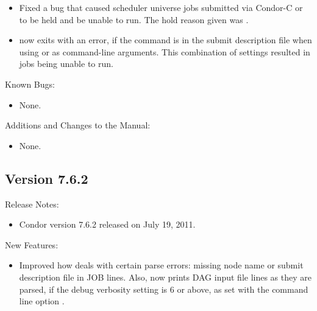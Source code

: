 \begin{itemize}
\item Fixed a bug that caused scheduler universe jobs submitted via
Condor-C or   to be held and be unable to run.
The hold reason given was .

\item {} now exits with an error,
if the command  is in the submit description file
when using  or  as command-line arguments. 
This combination of settings resulted in jobs being unable to run.

\end{itemize}

\noindent Known Bugs:

\begin{itemize}

\item None.

\end{itemize}

\noindent Additions and Changes to the Manual:

\begin{itemize}

\item None.

\end{itemize}


\subsection*{\label{sec:New-7-6-2}Version 7.6.2}

\noindent Release Notes:

\begin{itemize}

\item Condor version 7.6.2 released on July 19, 2011.

\end{itemize}


\noindent New Features:

\begin{itemize}

\item Improved how  deals with certain parse errors:
missing node name or submit description file in JOB lines.
Also, 
now prints DAG input file lines as they are parsed, 
if the debug verbosity setting is 6 or above,
as set with the  command line option .

\end{itemize}

